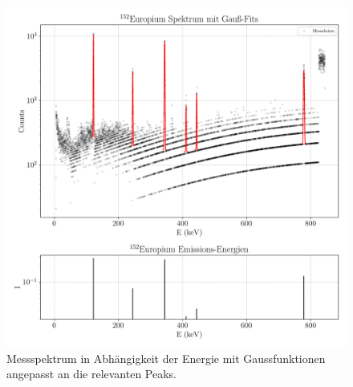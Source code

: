 \begin{figure}[H]
  \centering
  \includegraphics[scale=0.65]{Skripte/152Europium_with_Gaussians_and_Energies.png}
  \caption{Messspektrum in Abhängigkeit der Energie mit Gaussfunktionen angepasst an die relevanten Peaks.}
  \label{fig:Eu3}
\end{figure}
\newpage
